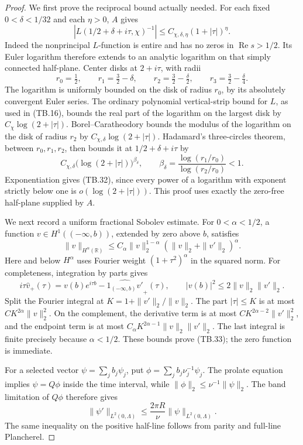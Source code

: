 \begin{proof}
We first prove the reciprocal bound actually needed.  For
each fixed \(0<\delta<1/32\) and each \(\eta>0\), \(A\) gives
\[
 \left|L(1/2+\delta+i\tau,\chi)^{-1}\right|
                   \leq C_{\chi,\delta,\eta}(1+|\tau|)^\eta.
 \tag{TB.32}
\]
Indeed the nonprincipal \(L\)-function is entire and has no
zeros in \(\operatorname{Re}s>1/2\).  Its Euler logarithm
therefore extends to an analytic logarithm on that simply
connected half-plane.  Center disks at \(2+i\tau\), with radii
\[
 r_0=\tfrac12,\qquad r_1=\tfrac32-\delta,\qquad
 r_2=\tfrac32-\tfrac\delta2,\qquad
 r_3=\tfrac32-\tfrac\delta4.
\]
The logarithm is uniformly bounded on the disk of radius
\(r_0\), by its absolutely convergent Euler series.
The ordinary polynomial vertical-strip bound for \(L\),
as used in (TB.16), bounds the real part of the logarithm
on the largest disk by \(C_\chi\log(2+|\tau|)\).
Borel--Caratheodory bounds the modulus of the logarithm on
the disk of radius \(r_2\) by
\(C_{\chi,\delta}\log(2+|\tau|)\).
Hadamard's three-circles theorem, between \(r_0,r_1,r_2\),
then bounds it at \(1/2+\delta+i\tau\) by
\[
 C_{\chi,\delta}\bigl(\log(2+|\tau|)\bigr)^{\beta_\delta},
 \qquad
 \beta_\delta=\frac{\log(r_1/r_0)}{\log(r_2/r_0)}<1.
\]
Exponentiation gives (TB.32), since every power of a
logarithm with exponent strictly below one is
\(o(\log(2+|\tau|))\).  This proof uses exactly the zero-free
half-plane supplied by \(A\).

We next record a uniform fractional Sobolev estimate.
For \(0<\alpha<1/2\), a function
\(v\in H^1((-\infty,b))\), extended by zero above \(b\),
satisfies
\[
 \|v\|_{H^\alpha(\mathbb R)}
 \leq C_\alpha\|v\|_2^{1-\alpha}
                         (\|v\|_2+\|v'\|_2)^\alpha.
 \tag{TB.33}
\]
Here and below \(H^\alpha\) uses Fourier weight
\((1+\tau^2)^\alpha\) in the squared norm.
For completeness, integration by parts gives
\[
 i\tau\widehat v_+(\tau)
       =v(b)e^{i\tau b}
                    -\widehat{1_{(-\infty,b)}v'}_+(\tau),
 \qquad |v(b)|^2\leq2\|v\|_2\|v'\|_2.
\]
Split the Fourier integral at
\(K=1+\|v'\|_2/\|v\|_2\).
The part \(|\tau|\leq K\) is at most
\(C K^{2\alpha}\|v\|_2^2\).
On the complement, the derivative term is at most
\(C K^{2\alpha-2}\|v'\|_2^2\), and the endpoint term is at
most \(C_\alpha K^{2\alpha-1}\|v\|_2\|v'\|_2\).
The last integral is finite precisely because \(\alpha<1/2\).
These bounds prove (TB.33); the zero function is immediate.

For a selected vector \(\psi=\sum_jb_j\psi_j\), put
\(\phi=\sum_jb_j\nu_j^{-1}\psi_j\).
The prolate equation implies \(\psi=Q\phi\) inside the time
interval, while
\(\|\phi\|_2\leq\nu^{-1}\|\psi\|_2\).
The band limitation of \(Q\phi\) therefore gives
\[
       \|\psi'\|_{L^2(0,\Lambda)}
             \leq\frac{2\pi R}{\nu}\|\psi\|_{L^2(0,\Lambda)}.
 \tag{TB.34}
\]
The same inequality on the positive half-line follows from
parity and full-line Plancherel.


\end{proof}
